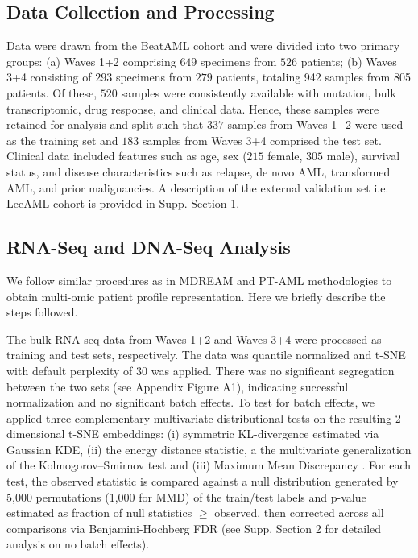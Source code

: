 \documentclass[sigconf,authordraft]{acmart}
\begin{document}
\subsection{Data Collection and Processing}
Data were drawn from the BeatAML cohort \cite{bottomly2022integrative} and were divided into two primary groups: (a) Waves 1+2 comprising $649$ specimens from $526$ patients; (b) Waves 3+4 consisting of $293$ specimens from $279$ patients, totaling 942 samples from 805 patients. Of these, $520$ samples were consistently available with mutation, bulk transcriptomic, drug response, and clinical data. Hence, these samples were retained for analysis and split such that $337$ samples from Waves 1+2 were used as the training set and $183$ samples from Waves 3+4 comprised the test set. Clinical data included features such as age, sex ($215$ female, $305$ male), survival status, and disease characteristics such as relapse, de novo AML, transformed AML, and prior malignancies. A description of the external validation set i.e. LeeAML cohort \cite{Lee_Celik_2018} is provided in Supp. Section 1.

\subsection{RNA-Seq and DNA-Seq Analysis}
We follow similar procedures as in MDREAM \cite{trac2023prediction} and PT-AML \cite{jani2024pt} methodologies to obtain multi-omic patient profile representation. Here we briefly describe the steps followed.

The bulk RNA-seq data \cite{tyner2018functional} from Waves 1+2 and Waves 3+4 were processed as training and test sets, respectively. The data was quantile normalized and t-SNE with default perplexity of 30 \cite{van2008visualizing} was applied. There was no significant segregation between the two sets (see Appendix Figure A1), indicating successful normalization and no significant batch effects. To test for batch effects, we applied three complementary multivariate distributional tests on the resulting 2-dimensional t-SNE embeddings: (i) symmetric KL-divergence estimated via Gaussian KDE, (ii) the energy distance statistic, a the multivariate generalization of the Kolmogorov–Smirnov test \cite{szekely2004testing} and (iii) Maximum Mean Discrepancy \cite{gretton2012optimal}. For each test, the observed statistic is compared against a null distribution generated by 5,000 permutations (1,000 for MMD) of the train/test labels and p-value estimated as fraction of null statistics $\ge$ observed, then corrected across all comparisons via Benjamini-Hochberg FDR \cite{benjamini1995controlling} (see Supp. Section 2 for detailed analysis on no batch effects). 
\end{document}
